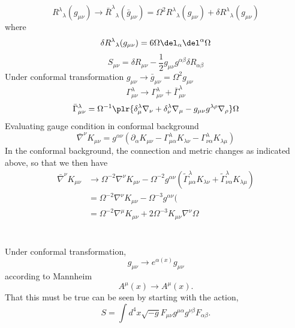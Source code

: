\documentclass[10pt,letterpaper]{article}
\begin{document}
\\ \\
\[
	R^\lambda{}_\lambda(g_{\mu\nu}) \to \bar R^\lambda{}_\lambda(\bar g_{\mu\nu}) =\Omega^2 R^\lambda{}_\lambda(g_{\mu\nu}) + \delta R^\lambda{}_\lambda(g_{\mu\nu})
\]
where
\[
	 \delta R^\lambda{}_\lambda(g_{\mu\nu}) = 6\Omega \del_\alpha \del^\alpha \Omega
\]
\[
	S_{\mu\nu} = \delta R_{\mu\nu} -\frac12 g_{\mu\nu} g^{\alpha\beta}\delta R_{\alpha\beta}
\]
Under conformal transformation $g_{\mu\nu} \to \bar g_{\mu\nu} = \Omega^2 g_{\mu\nu}$
\begin{equation}
	\Gamma^\lambda_{\mu\nu} \to \Gamma^\lambda_{\mu\nu} + \bar \Gamma^\lambda_{\mu\nu}
\end{equation}
\begin{equation}
	\bar\Gamma^\lambda_{\mu\nu} = \Omega^{-1}\plr{ \delta^\lambda_\mu \nabla_\nu + \delta^\lambda_\nu \nabla_\mu - g_{\mu\nu}g^{\lambda\rho}\nabla_\rho}\Omega
\end{equation} 
Evaluating gauge condition in conformal background
\begin{equation}
	\bar \nabla^\nu K_{\mu\nu} = g^{\alpha\nu}( \partial_\alpha K_{\mu\nu} - \Gamma^\lambda_{\mu\alpha}K_{\lambda\nu} - \Gamma^\lambda_{\nu\alpha}K_{\lambda\mu})
\end{equation}
In the conformal background, the connection and metric changes as indicated above, so that we then have
\begin{align}
	\bar \nabla^\nu K_{\mu\nu} &\to \Omega^{-2}\nabla^\nu K_{\mu\nu}-\Omega^{-2} g^{\alpha\nu}( \tilde \Gamma^\lambda_{\mu\alpha}K_{\lambda\nu} + \tilde \Gamma^\lambda_{\nu\alpha}K_{\lambda\mu})\nonumber \\
& =  \Omega^{-2}\nabla^\nu K_{\mu\nu}-\Omega^{-3} g^{\alpha\nu}(\\
&= \Omega^{-2}\nabla^\mu K_{\mu\nu} + 2\Omega^{-3} K_{\mu\nu} \nabla^\nu \Omega
\end{align}
\\ \\
Under conformal transformation,
\begin{equation}
g_{\mu\nu} \to e^{\alpha(x)}g_{\mu\nu}
\end{equation}
according to Mannheim
\begin{equation}
	A^\mu(x) \to A^{\mu}(x).
\end{equation}
That this must be true can be seen by starting with the action,
\begin{equation}
	S = \int d^4x \sqrt{-g} F_{\mu\nu} g^{\mu\alpha}g^{\nu\beta}F_{\alpha\beta}.
\end{equation}
\end{document}
